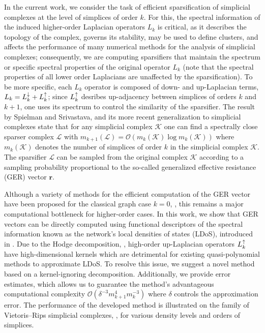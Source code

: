 In the current work, we consider the task of efficient sparsification of simplicial complexes at the level of simplices of order \( k \). 
For this, the spectral information of the induced higher-order Laplacian operators \( L_k \) is critical, as it describes the topology of the complex, governs its stability, may be used to define clusters, and affects the performance of many numerical methods for the analysis of simplicial complexes; consequently, we are computing sparsifiers that maintain the spectrum or specific spectral properties of the original operator \( L_k \) (note that the spectral properties of all lower order Laplacians are unaffected by the sparsification). { To be more specific, each \(L_k\) operator is composed of down- and up-Laplacian terms, \(L_k = L_{k}^{\downarrow} + L_{k}^{\uparrow}\); since \( L_{k}^{\uparrow} \) desribes up-adjacency between simplices of orders \( k \) and \( k+1\), one uses its spectrum to control the similarity of the sparsifier.}
The result by Spielman and Srivastava, \cite{spielman2008graph, spielman2011spectral} and its more recent generalization to simplicial complexes \cite{osting2017spectral} state that for any simplicial complex \( \mathcal K \) one can find a spectrally close sparser complex \( \mathcal L \) with \( m_{k+1}(\mathcal L ) = \mathcal O ( m_{k} (\mathcal K) \log m_{k}(\mathcal K) ) \) where \( m_k(\mathcal K)\) denotes the number of simplices of order $k$ in the simplicial complex \(\mathcal K\). The sparsifier \( \mathcal L \) can be sampled from the original complex \( \mathcal K \) according to a sampling probability proportional to the so-called generalized effective resistance (GER) vector \( \mathbf r \).

Although a variety of methods for the efficient computation of the GER vector have been proposed for the classical graph case \( k = 0 \), \cite{cohen2014solving, spielman2014nearly, kelner2013simple}, this remains a major computational bottleneck for higher-order cases. In this work, we show that GER vectors can be directly computed using functional descriptors of the spectral information known as the network's local densities of states (LDoS), introduced in \cite{dong2019network}. 
Due to the Hodge decomposition, \cite{Lim15,schaub2019random}, high-order up-Laplacian operators \( L_{k}^{\uparrow} \) have high-dimensional kernels which are detrimental for existing quasi-polynomial methods to approximate LDoS.
To resolve this issue, we suggest a novel method based on a kernel-ignoring decomposition. Additionally, we provide error estimates, which allows us to guarantee the method's advantageous computational complexity \( \mathcal O \left( \delta^{-3} {m_{k+1}^4}{m_k^{-3}} \right)\) where \( \delta \) controls the approximation error.
The performance of the developed method is illustrated on the family of Vietoris--Rips simplicial complexes, \cite{hausmann1994vietoris}, for various density levels and orders of simplices.







